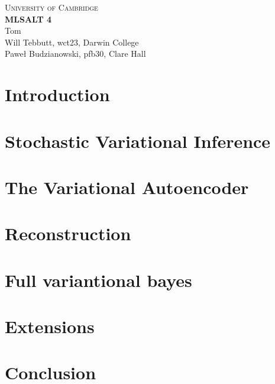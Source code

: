 \documentclass[10pt,a4paper]{article}
\begin{document}
\begin{center}
\Large{\textsc{
University of Cambridge}}\\
\vspace{.5cm}
\large\textbf{MLSALT 4}\\
\vspace{.5cm}
\large{Tom}\\
\large{Will Tebbutt, wct23, Darwin College}\\
\large{Paweł Budzianowski, pfb30, Clare Hall}\\
\end{center} 

\section{Introduction}


\section{Stochastic Variational Inference}


\section{The Variational Autoencoder}


\section{Reconstruction}


\section{Full variantional bayes}


\section{Extensions}


\section{Conclusion}




\end{document}
